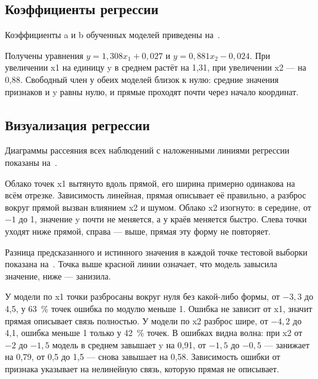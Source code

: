 \documentclass[a4paper,14pt]{extarticle}
\begin{document}
\subsection{Коэффициенты регрессии}

Коэффициенты a и b обученных моделей приведены на~.


Получены уравнения $y = 1{,}308 x_1 + 0{,}027$ и $y = 0{,}881 x_2 - 0{,}024$. При увеличении x1 на единицу y в среднем растёт на 1,31, при увеличении x2 — на 0,88. Свободный член у обеих моделей близок к нулю: средние значения признаков и y равны нулю, и прямые проходят почти через начало координат.

\subsection{Визуализация регрессии}

Диаграммы рассеяния всех наблюдений с наложенными линиями регрессии показаны на~.


Облако точек x1 вытянуто вдоль прямой, его ширина примерно одинакова на всём отрезке. Зависимость линейная, прямая описывает её правильно, а разброс вокруг прямой вызван влиянием x2 и шумом. Облако x2 изогнуто: в середине, от $-1$ до 1, значение y почти не меняется, а у краёв меняется быстро. Слева точки уходят ниже прямой, справа — выше, прямая эту форму не повторяет.

Разница предсказанного и истинного значения в каждой точке тестовой выборки показана на~. Точка выше красной линии означает, что модель завысила значение, ниже — занизила.


У модели по x1 точки разбросаны вокруг нуля без какой-либо формы, от $-3{,}3$ до 4,5, у 63~\% точек ошибка по модулю меньше 1. Ошибка не зависит от x1, значит прямая описывает связь полностью. У модели по x2 разброс шире, от $-4{,}2$ до 4,1, ошибка меньше 1 только у 42~\% точек. В ошибках видна волна: при x2 от $-2$ до $-1{,}5$ модель в среднем завышает y на 0,91, от $-1{,}5$ до $-0{,}5$ — занижает на 0,79, от 0,5 до 1,5 — снова завышает на 0,58. Зависимость ошибки от признака указывает на нелинейную связь, которую прямая не описывает.
\end{document}
